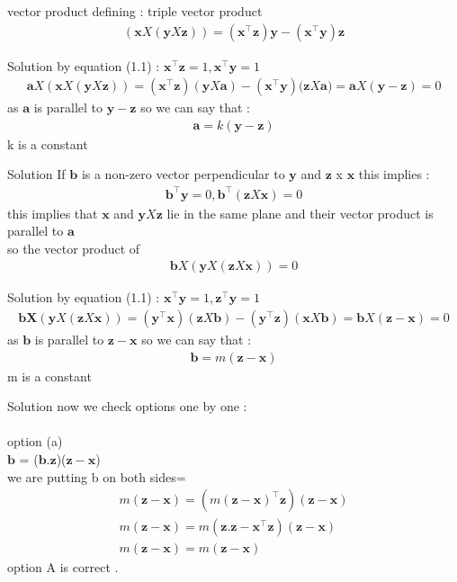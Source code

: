 \documentclass{beamer}
\let\vec\mathbf
\theoremstyle{remark}
\numberwithin{equation}{section}
\begin{document}
\begin{frame}{vector product}
defining : triple vector product 
\begin{align*}
    (\vec{x}X(\vec{y} X \vec{z}))=(\vec{x}^\top \vec{z})\vec{y}-(\vec{x}^\top \vec{y})\vec{z}
\end{align*}
\end{frame}
\begin{frame}{Solution}
by equation (1.1) : $\vec{x}^\top\vec{z}=1,\vec{x}^\top\vec{y}=1$
\begin{align*}
    \vec{a}X(\vec{x}X(\vec{y} X \vec{z}))=(\vec{x}^\top\vec{z})(\vec{y}X\vec{a})-(\vec{x}^\top\vec{y})(\vec{z}X\vec{a)}=\vec{a}X(\vec{y}-\vec{z})=0
\end{align*}
as $\vec{a}$ is parallel to $\vec{y}-\vec{z}$ so we can say that :
\begin{align*}
    \vec{a}=k(\vec{y}-\vec{z})
\end{align*}    
k is a  constant
\end{frame}
\begin{frame}{Solution}
If $\vec{b}$ is a non-zero vector perpendicular to $\vec{y}$ and $\vec{z}$ x $\vec{x}$ this implies :
\\
\begin{align*}
    \vec{b}^\top\vec{y}=0, \vec{b}^\top(\vec{z} X \vec{x})=0
\end{align*}
this implies that  $\vec{x}$ and $\vec{y} X \vec{z}$ lie in the same plane and their vector product is parallel to $\vec{a}$
\\
so the vector product of 
\\
\begin{align*}
    \vec{b}X(\vec{y}X(\vec{z} X \vec{x}))=0
\end{align*}
\end{frame}
\begin{frame}{Solution}
by equation (1.1) :  $\vec{x}^\top\vec{y}=1,\vec{z}^\top\vec{y}=1$
\begin{align*}
    \vec{bX}(\vec{y}X(\vec{z} X \vec{x}))=(\vec{y}^\top\vec{x})(\vec{z}X\vec{b})-(\vec{y}^\top\vec{z})(\vec{x}X\vec{b})=\vec{b}X(\vec{z}-\vec{x})=0 
\end{align*}
as $\vec{b}$ is parallel to $\vec{z}-\vec{x}$ so we can say that :
\begin{align*}
    \vec{b}=m(\vec{z}-\vec{x}) 
\end{align*}
m is a  constant
\end{frame}
\begin{frame}{Solution}
now we check options one by one :
\\
\\
option (a)
\\
$\vec{b}$ = ($\vec{b}.\vec{z}$)($\vec{z}-\vec{x}$)
\\
we are putting b on both sides=
 \begin{align*}
    m(\vec{z}-\vec{x})=( m(\vec{z}-\vec{x})^\top\vec{z})(\vec{z}-\vec{x}) 
    \\
    m(\vec{z}-\vec{x})=m(\vec{z}.\vec{z}-\vec{x}^\top\vec{z})(\vec{z}-\vec{x}) 
    \\
     m(\vec{z}-\vec{x})= m(\vec{z}-\vec{x})
 \end{align*}
 option A is correct . 
\end{frame}
\end{document}
